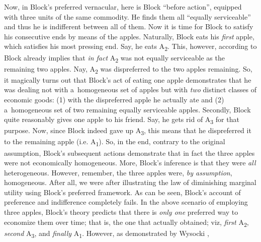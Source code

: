 Now, in Block's preferred vernacular, here is Block ``before action'', equipped with three units of the same commodity. He finds them all ``equally serviceable'' and thus he is indifferent between all of them. Now it is time for Block to satisfy his consecutive ends by means of the apples. Naturally, Block eats his \textit{first} apple, which satisfies his most pressing end. Say, he eats A\textsubscript{2}. This, however, according to Block already implies that \textit{in fact} A\textsubscript{2} was not equally serviceable as the remaining two apples. Nay, A\textsubscript{2} was dispreferred to the two apples remaining. So, it magically turns out that Block's act of eating one apple demonstrates that he was dealing not with a~homogeneous set of apples but with \textit{two} distinct classes of economic goods: (1) with the dispreferred apple he actually ate and (2) a~homogeneous set of two remaining equally serviceable apples. Secondly, Block quite reasonably gives one apple to his friend. Say, he gets rid of A\textsubscript{3} for that purpose. Now, since Block indeed gave up A\textsubscript{3}, this means that he dispreferred it to the remaining apple (i.e. A\textsubscript{1}). So, in the end, contrary to the original assumption, Block's subsequent actions demonstrate that in fact the three apples were not economically homogeneous. More, Block's inference is that they were \textit{all} heterogeneous. However, remember, the three apples were, \textit{by assumption}, homogeneous. After all, we were after illustrating the law of diminishing marginal utility using Block's preferred framework. As can be seen, Block's account of preference and indifference completely fails. In the above scenario of employing three apples, Block's theory predicts that there is \textit{only one} preferred way to economize them over time; that is, the one that actually obtained; viz, \textit{first} A\textsubscript{2}, \textit{second} A\textsubscript{3}, and \textit{finally} A\textsubscript{1}. However, as demonstrated by Wysocki 
\parencite*[][p.41]{wysocki_problem_2021}, %
